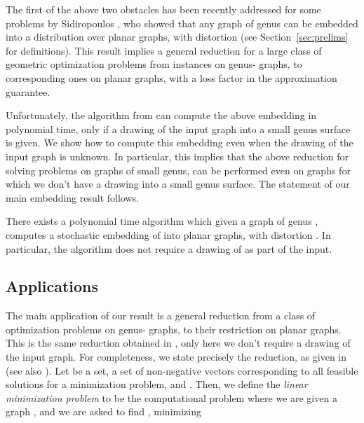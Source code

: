 \documentclass[envcountsect]{llncs}
\begin{document}
The first of the above two obstacles has been recently addressed for some problems by Sidiropoulos \cite{sidiropoulos2010optimal}, who showed that any graph of genus  can be embedded into a distribution over planar graphs, with distortion  (see Section~\ref{sec:prelims} for definitions).
This result implies a general reduction for a large class of geometric optimization problems from instances on genus- graphs, to corresponding ones on planar graphs, with a  loss factor in the approximation guarantee. 

Unfortunately, the algorithm from \cite{sidiropoulos2010optimal} can compute the above embedding in polynomial time, only if a drawing of the input graph into a small genus surface is given.
We show how to compute this embedding even when the drawing of the input graph is unknown.
In particular, this implies that the above reduction for solving problems on graphs of small genus, can be performed even on graphs for which we don't have a drawing into a small genus surface.
The statement of our main embedding result follows.

\begin{theorem}\label{tim:main}
There exists a polynomial time algorithm which given a graph  of genus , computes a stochastic embedding of  into planar graphs, with distortion .
In particular, the algorithm does not require a drawing of  as part of the input.
\end{theorem}

\iffalse
\begin{theorem}[Planarization of an unknown surface]\label{thm:main}
Any graph  of genus , admits a stochastic embedding into planar graphs, with distortion .
Moreover, given a drawing of  into a genus- surface, the embedding can be computed in polynomial time.
\end{theorem}
\fi

\subsection{Applications}

The main application of our result is a general
reduction from a class of optimization problems on
genus- graphs, to their restriction on planar graphs.
This is the same reduction obtained in \cite{sidiropoulos2010optimal},
only here we don't require a drawing of the input graph.
For completeness, we state precisely the reduction, as given in \cite{sidiropoulos2010optimal} (see also \cite{Bar96}).
Let  be a set,
 a set of non-negative vectors corresponding to all feasible solutions for a minimization problem, and .
Then, we define the \emph{linear minimization problem}  to be the computational problem where we are given a graph , and we are asked to find , minimizing
\end{document}
